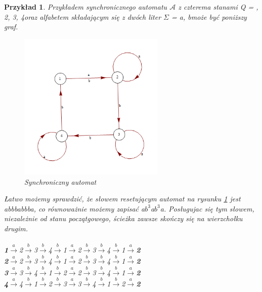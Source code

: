 \documentclass[12pt,a4paper]{article}
\newtheorem{pr}{Przyk{\l}ad}[section]
\begin{document}
\begin{pr}
\label{pr:przyklad1}
Przyk{\l}adem synchronicznego automatu  $\mathscr{A}$ z czterema stanami Q = , 2, 3, 4\textbraceright  oraz alfabetem sk{\l}adaj\k{a}cym si\k{e} z dw\'{o}ch liter $\Sigma$ = \textbraceleft a, b\textbraceright  mo\.{z}e by\'c poni\.{z}szy graf.
\begin{figure}[H]
    \centering
    \includegraphics[width=0.62\textwidth]{rysunek1}
    \caption{Synchroniczny automat}
    \label{fig:rysunek1}
\end{figure}

{\L}atwo mo\.{z}emy sprawdzi\'{c}, \.{z}e s{\l}owem resetuj\k{a}cym automat na rysunku \ref{fig:rysunek1} jest \textit{abbbabbba}, co r\'{o}wnowa\.{z}nie mo\.{z}emy zapisa\'{c} \textit{a$b^{3}$a$b^{3}$a}. Pos{\l}ugujac si\k{e} tym s{\l}owem, niezale\.{z}nie od stanu pocz\k{a}tgowego, \'{s}cie\.{z}ka zawsze sko\'{n}czy si\k{e} na wierzcho{\l}ku drugim.\\
\\
\textbf{1}$\xrightarrow{a}$2$\xrightarrow{b}$3$\xrightarrow{b}$4$\xrightarrow{b}$1$\xrightarrow{a}$2$\xrightarrow{b}$3$\xrightarrow{b}$4$\xrightarrow{b}$1$\xrightarrow{a}$\textbf{2}\\
\textbf{2}$\xrightarrow{a}$2$\xrightarrow{b}$3$\xrightarrow{b}$4$\xrightarrow{b}$1$\xrightarrow{a}$2$\xrightarrow{b}$3$\xrightarrow{b}$4$\xrightarrow{b}$1$\xrightarrow{a}$\textbf{2}\\
\textbf{3}$\xrightarrow{a}$3$\xrightarrow{b}$4$\xrightarrow{b}$1$\xrightarrow{b}$2$\xrightarrow{a}$2$\xrightarrow{b}$3$\xrightarrow{b}$4$\xrightarrow{b}$1$\xrightarrow{a}$\textbf{2}\\
\textbf{4}$\xrightarrow{a}$4$\xrightarrow{b}$1$\xrightarrow{b}$2$\xrightarrow{b}$3$\xrightarrow{a}$3$\xrightarrow{b}$4$\xrightarrow{b}$1$\xrightarrow{b}$2$\xrightarrow{a}$\textbf{2}
\end{pr}
\end{document}
